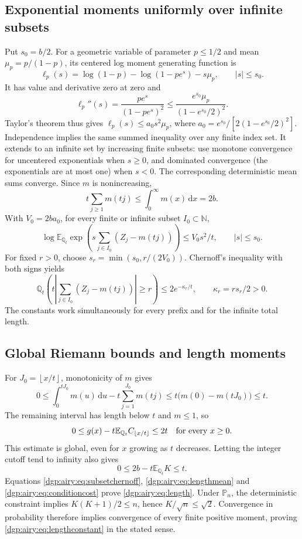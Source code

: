 \documentclass[11pt,letterpaper]{article}
\numberwithin{equation}{section}
\theoremstyle{remark}\newtheorem{remark}[theorem]{Remark}
\newcommand{\PP}{\mathbb P}
\newcommand{\EE}{\mathbb E}
\newcommand{\QQ}{\mathbb Q}
\newcommand{\NN}{\mathbb N}
\newcommand{\floor}[1]{\left\lfloor #1\right\rfloor}
\newcommand{\dd}{\,\mathrm d}
\begin{document}
\subsection{Exponential moments uniformly over infinite subsets}
Put $s_0=b/2$. For a geometric variable of parameter $p\leq1/2$
and mean $\mu_p=p/(1-p)$, its centered log moment generating function
is
\[
 \ell_p(s)=\log(1-p)-\log(1-pe^s)-s\mu_p,\qquad |s|\leq s_0.
\]
It has value and derivative zero at zero and
\[
 \ell_p''(s)=\frac{pe^s}{(1-pe^s)^2}
 \leq\frac{e^{s_0}\mu_p}{(1-e^{s_0}/2)^2}.
\]
Taylor's theorem thus gives $\ell_p(s)\leq a_0s^2\mu_p$, where
$a_0=e^{s_0}/[2(1-e^{s_0}/2)^2]$.
Independence implies the same summed inequality over any finite
index set. It extends to an infinite set by increasing finite
subsets: use monotone convergence for uncentered exponentials when
$s\geq0$, and dominated convergence (the exponentials are at most
one) when $s<0$. The corresponding deterministic mean sums converge.
Since $m$ is nonincreasing,
\[
 t\sum_{j\geq1}m(tj)\leq\int_0^\infty m(x)\dd x=2b.
\]
With $V_0=2ba_0$, for every finite or infinite subset $I_0\subset\NN$,
\begin{equation}\label{dgp:airy:eq:subsetmgf}
 \log\EE_{\QQ_t}\exp\!\left(s\sum_{j\in I_0}(Z_j-m(tj))\right)
 \leq V_0s^2/t,\qquad |s|\leq s_0.
\end{equation}
For fixed $r>0$, choose $s_r=\min(s_0,r/(2V_0))$.
Chernoff's inequality with both signs yields
\begin{equation}\label{dgp:airy:eq:subsetchernoff}
 \QQ_t\!\left(t\left|\sum_{j\in I_0}(Z_j-m(tj))\right|\geq r\right)
 \leq2e^{-\kappa_r/t},\qquad \kappa_r=rs_r/2>0.
\end{equation}
The constants work simultaneously for every prefix and for the
infinite total length.

\subsection{Global Riemann bounds and length moments}
For $J_0=\floor{x/t}$, monotonicity of $m$ gives
\[
 0\leq\int_0^{tJ_0}m(u)\dd u-t\sum_{j=1}^{J_0}m(tj)
 \leq t\bigl(m(0)-m(tJ_0)\bigr)\leq t.
\]
The remaining interval has length below $t$ and $m\leq1$, so
\begin{equation}\label{dgp:airy:eq:globalriemann}
 0\leq g(x)-t\EE_{\QQ_t}C_{\floor{x/t}}\leq2t
 \quad\hbox{for every }x\geq0.
\end{equation}
This estimate is global, even for $x$ growing as $t$ decreases.
Letting the integer cutoff tend to infinity also gives
\begin{equation}\label{dgp:airy:eq:lengthmean}
 0\leq2b-t\EE_{\QQ_t}K\leq t.
\end{equation}
Equations \eqref{dgp:airy:eq:subsetchernoff}, \eqref{dgp:airy:eq:lengthmean} and
\eqref{dgp:airy:eq:conditioncost} prove \eqref{dgp:airy:eq:length}.
Under $\PP_n$, the deterministic constraint implies
$K(K+1)/2\leq n$, hence $K/\sqrt n\leq\sqrt2$.
Convergence in probability therefore implies convergence of every
finite positive moment, proving \eqref{dgp:airy:eq:lengthconstant} in the
stated sense.
\end{document}
